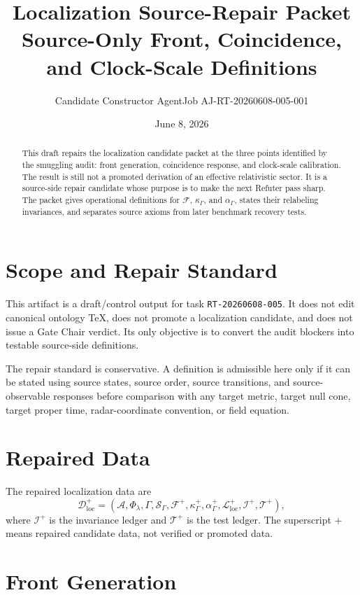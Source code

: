 \documentclass[11pt]{article}
\title{\textbf{Localization Source-Repair Packet}\\[0.35em]
\large Source-Only Front, Coincidence, and Clock-Scale Definitions}
\author{Candidate Constructor AgentJob AJ-RT-20260608-005-001}
\date{June 8, 2026}
\newcommand{\Sub}{\mathcal{A}}
\newcommand{\PhiFlow}{\Phi_{\lambda}}
\newcommand{\Order}{\mathcal{S}}
\newcommand{\Front}{\mathcal{F}}
\newcommand{\Map}{\mathcal{L}_{\mathrm{loc}}}
\newcommand{\Data}{\mathcal{D}_{\mathrm{loc}}}
\begin{document}
\maketitle

\begin{abstract}
This draft repairs the localization candidate packet at the three points
identified by the smuggling audit: front generation, coincidence response, and
clock-scale calibration. The result is still not a promoted derivation of an
effective relativistic sector. It is a source-side repair candidate whose
purpose is to make the next Refuter pass sharp. The packet gives operational
definitions for \(\Front\), \(\kappa_{\Gamma}\), and \(\alpha_{\Gamma}\), states
their relabeling invariances, and separates source axioms from later benchmark
recovery tests.
\end{abstract}

\section{Scope and Repair Standard}

This artifact is a draft/control output for task \texttt{RT-20260608-005}. It
does not edit canonical ontology TeX, does not promote a localization
candidate, and does not issue a Gate Chair verdict. Its only objective is to
convert the audit blockers into testable source-side definitions.

The repair standard is conservative. A definition is admissible here only if it
can be stated using source states, source order, source transitions, and
source-observable responses before comparison with any target metric, target
null cone, target proper time, radar-coordinate convention, or field equation.

\section{Repaired Data}

The repaired localization data are
\[
\Data^{+}
=
(\Sub,\PhiFlow,\Gamma,\Order_{\Gamma},\Front^{+},
\kappa^{+}_{\Gamma},\alpha^{+}_{\Gamma},\Map^{+},\mathcal{I}^{+},
\mathcal{T}^{+}),
\]
where \(\mathcal{I}^{+}\) is the invariance ledger and \(\mathcal{T}^{+}\) is
the test ledger. The superscript \(+\) means repaired candidate data, not
verified or promoted data.

\section{Front Generation}
\end{document}
